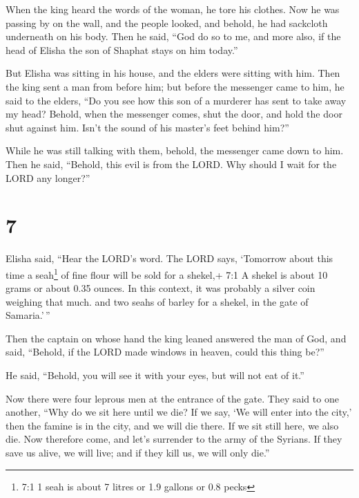  When the king heard the words of the woman, he tore his
clothes. Now he was passing by on the wall, and the people looked, and
behold, he had sackcloth underneath on his body.  Then he
said, ``God do so to me, and more also, if the head of Elisha the son of
Shaphat stays on him today.''

 But Elisha was sitting in his house, and the elders were
sitting with him. Then the king sent a man from before him; but before
the messenger came to him, he said to the elders, ``Do you see how this
son of a murderer has sent to take away my head? Behold, when the
messenger comes, shut the door, and hold the door shut against him.
Isn't the sound of his master's feet behind him?''

 While he was still talking with them, behold, the
messenger came down to him. Then he said, ``Behold, this evil is from
the LORD. Why should I wait for the LORD any longer?''

\hypertarget{section-6}{%
\section{7}\label{section-6}}

 Elisha said, ``Hear the LORD's word. The LORD says,
`Tomorrow about this time a seah\footnote{7:1 1 seah is about 7 litres
  or 1.9 gallons or 0.8 pecks} of fine flour will be sold for a shekel,+
7:1 A shekel is about 10 grams or about 0.35 ounces. In this context, it
was probably a silver coin weighing that much. and two seahs of barley
for a shekel, in the gate of Samaria.'\,''

 Then the captain on whose hand the king leaned answered the
man of God, and said, ``Behold, if the LORD made windows in heaven,
could this thing be?''

He said, ``Behold, you will see it with your eyes, but will not eat of
it.''

 Now there were four leprous men at the entrance of the
gate. They said to one another, ``Why do we sit here until we die?
 If we say, `We will enter into the city,' then the famine
is in the city, and we will die there. If we sit still here, we also
die. Now therefore come, and let's surrender to the army of the Syrians.
If they save us alive, we will live; and if they kill us, we will only
die.''

